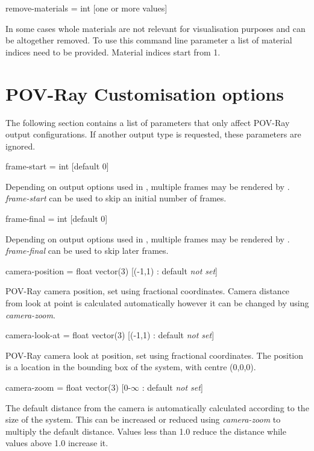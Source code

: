 {\zicf remove-materials = int [one or more values] }
 In some cases
whole materials are not relevant for visualisation purposes and can be
altogether removed. To use this command line parameter a list of material
indices need to be provided. Material indices start from 1.

\section*{POV-Ray Customisation options}

The following section contains a list of parameters that only affect POV-Ray
output configurations. If another output type is requested, these parameters
are ignored.

{\zicf frame-start = int [default 0]}
 Depending on
output options used in \vampire, multiple frames may be rendered by \vdc.
\textit{frame-start} can be used to skip an initial number of frames.

{\zicf frame-final = int [default 0]}
 Depending on
output options used in \vampire, multiple frames may be rendered by \vdc.
\textit{frame-final} can be used to skip later frames.

{\zicf camera-position = float vector(3) [(-1,1) : default \textit{not set}]}
 POV-Ray camera
position, set using fractional coordinates. Camera distance from look at point
is calculated automatically however it can be changed by using
\textit{camera-zoom}.

{\zicf camera-look-at = float vector(3) [(-1,1) : default \textit{not set}]}
 POV-Ray camera
look at position, set using fractional coordinates. The position is a location
in the bounding box of the system, with centre (0,0,0).

{\zicf camera-zoom = float vector(3) [0-$\infty$ : default \textit{not set}]}
 The default
distance from the camera is automatically calculated according to the size of
the system. This can be increased or reduced using \textit{camera-zoom} to
multiply the default distance. Values less than 1.0 reduce the distance while
values above 1.0 increase it.

